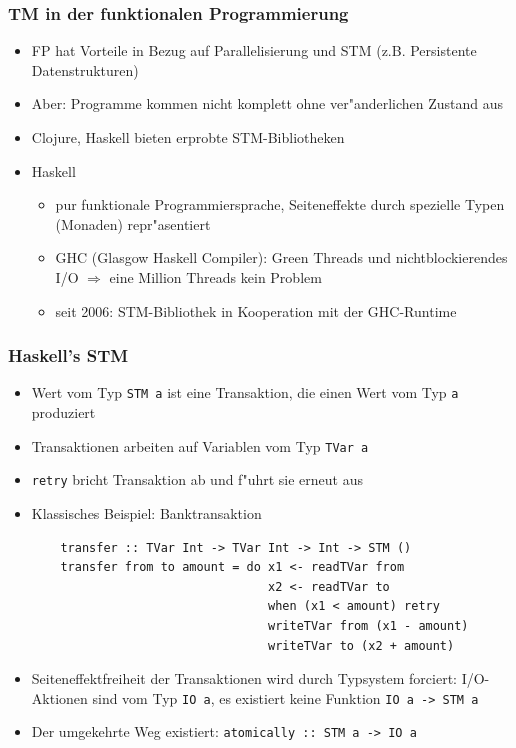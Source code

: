 \documentclass[t]{beamer}
\begin{document}
\lstset{language=Haskell}

\begin{frame}
  \frametitle{TM in der funktionalen Programmierung}
  \begin{itemize}
    \item FP hat Vorteile in Bezug auf Parallelisierung und STM
          (z.B. Persistente Datenstrukturen)
    \item Aber: Programme kommen nicht komplett ohne ver"anderlichen Zustand aus
    \item Clojure, Haskell bieten erprobte STM-Bibliotheken
    \item Haskell
      \begin{itemize}
      \item pur funktionale Programmiersprache, Seiteneffekte durch spezielle
            Typen (Monaden) repr"asentiert
      \item GHC (Glasgow Haskell Compiler): Green Threads und nichtblockierendes I/O
            $\Rightarrow$ eine Million Threads kein Problem
      \item seit 2006: STM-Bibliothek in Kooperation mit der GHC-Runtime
      \end{itemize}
  \end{itemize}
\end{frame}

\begin{frame}[fragile]
  \frametitle{Haskell's STM}

  \begin{itemize}
  \item Wert vom Typ \lstinline|STM a| ist eine Transaktion, die einen Wert vom Typ
        \lstinline|a| produziert
  \item Transaktionen arbeiten auf Variablen vom Typ \lstinline|TVar a|
  \item \lstinline|retry| bricht Transaktion ab und f"uhrt sie erneut aus
  \item Klassisches Beispiel: Banktransaktion
    \begin{lstlisting}
    transfer :: TVar Int -> TVar Int -> Int -> STM ()
    transfer from to amount = do x1 <- readTVar from
                                 x2 <- readTVar to
                                 when (x1 < amount) retry
                                 writeTVar from (x1 - amount)
                                 writeTVar to (x2 + amount)
    \end{lstlisting}
  \item Seiteneffektfreiheit der Transaktionen wird durch Typsystem forciert:
        I/O-Aktionen sind vom Typ \lstinline|IO a|, es existiert keine Funktion
           \lstinline|IO a -> STM a|
  \item Der umgekehrte Weg existiert: \lstinline|atomically :: STM a -> IO a|
  \end{itemize}
\end{frame}
\end{document}
